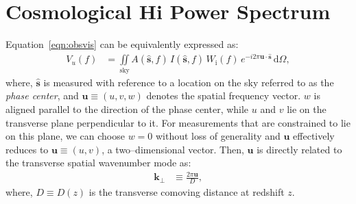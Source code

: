 \documentclass[preprint2,iop,numberedappendix,twocolappendix,appendixfloats]{emulateapj}
\newcommand{\dif}{\mathrm{d}}
\begin{document}
\section{Cosmological H{\sc i} Power Spectrum}\label{sec:EoR-power-spectrum}

Equation~\ref{eqn:obsvis} can be equivalently expressed as:
\begin{align}\label{eqn:vis}
  V_u(f) &= \iint\limits_\textrm{sky} A(\hat{\boldsymbol{s}},f)\,I(\hat{\boldsymbol{s}},f)\,W_\textrm{i}(f)\,e^{-i2\pi\boldsymbol{u}\cdot\hat{\boldsymbol{s}}}\,\dif\Omega,
\end{align}
where, $\hat{\boldsymbol{s}}$ is measured with reference to a location on the sky referred to as the {\it phase center}, and $\boldsymbol{u}\equiv (u,v,w)$ denotes the spatial frequency vector. $w$ is aligned parallel to the direction of the phase center, while $u$ and $v$ lie on the transverse plane perpendicular to it. For measurements that are constrained to lie on this plane, we can choose $w=0$ without loss of generality and $\boldsymbol{u}$ effectively reduces to $\boldsymbol{u}\equiv (u,v)$, a two--dimensional vector. Then, $\boldsymbol{u}$ is directly related to the transverse spatial wavenumber mode as: 
\begin{align}\label{eqn:k-perp}
  \boldsymbol{k}_\perp &\equiv \frac{2\pi\boldsymbol{u}}{D}, 
\end{align}
where, $D\equiv D(z)$ is the transverse comoving distance at redshift $z$. 
\end{document}
